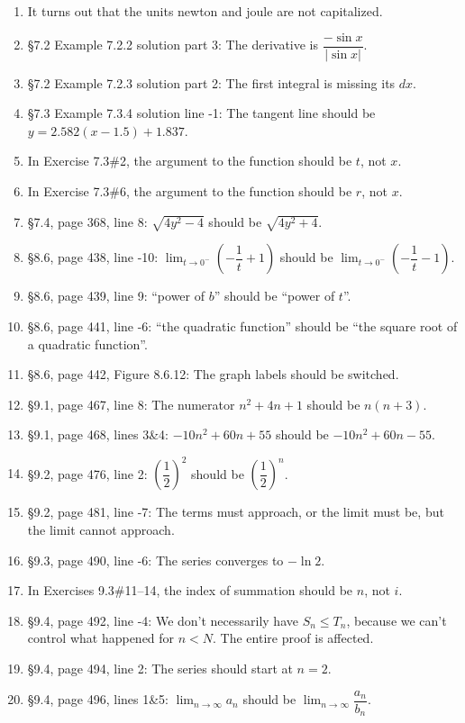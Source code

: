 \documentclass{amsart}
\newcommand{\ds}{\displaystyle}
\newcommand{\abs}[1]{\left\lvert#1\right\rvert}
\begin{document}
\begin{enumerate}
\item It turns out that the units newton and joule are not capitalized.
\item \S7.2 Example 7.2.2 solution part 3: The derivative is $\dfrac{-\sin x}{\abs{\sin x}}$.
\item \S7.2 Example 7.2.3 solution part 2: The first integral is missing its $dx$.
\item \S7.3 Example 7.3.4 solution line -1: The tangent line should be $y=2.582(x-1.5)+1.837$.
\item In Exercise 7.3\#2, the argument to the function should be $t$, not $x$.
\item In Exercise 7.3\#6, the argument to the function should be $r$, not $x$.
\item \S7.4, page 368, line 8: $\sqrt{4y^2-4}$ should be $\sqrt{4y^2+4}$.
\item \S8.6, page 438, line -10: $\ds\lim_{t\to0^-}\left(-\dfrac1t+1\right)$ should be $\ds\lim_{t\to0^-}\left(-\dfrac1t-1\right)$.
\item \S8.6, page 439, line 9: ``power of $b$'' should be ``power of $t$''.
\item \S8.6, page 441, line -6: ``the quadratic function'' should be ``the square root of a quadratic function''.
\item \S8.6, page 442, Figure 8.6.12: The graph labels should be switched.
\item \S9.1, page 467, line 8: The numerator $n^2+4n+1$ should be $n(n+3)$.
\item \S9.1, page 468, lines 3\&4: $-10n^2+60n+55$ should be $-10n^2+60n-55$.
\item \S9.2, page 476, line 2: $\left(\dfrac12\right)^2$ should be $\left(\dfrac12\right)^n$.
\item \S9.2, page 481, line -7: The terms must approach, or the limit must be, but the limit cannot approach.
\item \S9.3, page 490, line -6: The series converges to $-\ln 2$.
\item In Exercises 9.3\#11--14, the index of summation should be $n$, not $i$.
\item \S9.4, page 492, line -4: We don't necessarily have $S_n\le T_n$, because we can't control what happened for $n<N$.  The entire proof is affected.
\item \S9.4, page 494, line 2: The series should start at $n=2$.
\item \S9.4, page 496, lines 1\&5: $\ds\lim_{n\to\infty}a_n$ should be $\ds\lim_{n\to\infty}\dfrac{a_n}{b_n}$.

\end{enumerate}
\end{document}
